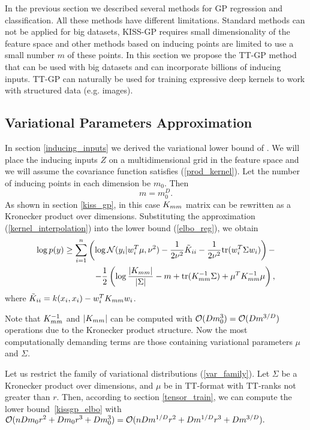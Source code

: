 In the previous section we described several methods for GP regression and
classification. All these methods have different limitations. Standard methods
can not be applied for big datasets, KISS-GP requires small dimensionality of
the feature space and other methods based on inducing points are limited to use
a small number $m$ of these points. In this section we propose the TT-GP method
that can be used with big datasets and can incorporate billions of inducing
inputs. TT-GP can naturally be used for training expressive deep kernels to work
with structured data (e.g. images).

\subsection{Variational Parameters Approximation}
  In section \ref{inducing_inputs} we derived the variational lower bound of
  \citet{hensman2013}. We will place the inducing inputs $Z$ on a
  multidimensional grid in the feature space and we will assume the
  covariance function satisfies (\ref{prod_kernel}). Let the number
  of inducing points in each dimension be $m_0$. Then
  \[
    m = m_0^D.
  \]
  As shown in section \ref{kiss_gp},
  in this case $K_{mm}$ matrix can be rewritten as a Kronecker product over
  dimensions. Substituting the approximation (\ref{kernel_interpolation}) into
  the lower bound (\ref{elbo_reg}), we obtain
  \begin{equation}
  \label{kissgp_elbo}
    \begin{split}
      \log p(y) \ge
      \sum_{i=1}^n \left ( \log \mathcal{N} (y_i | w_i^T \mu, \nu^2) -
        \frac 1 {2\nu^2} \tilde K_{ii} -
        \frac 1 {2\nu^2} \mbox{tr} (w_i^T \Sigma w_i)
      \right )-
      \\
      - \frac 1 2 \left(
        \log \frac {|K_{mm}|} {|\Sigma|} - m + \mbox{tr}(K_{mm}^{-1} \Sigma) +
        \mu^T K_{mm}^{-1} \mu
      \right),
    \end{split}
  \end{equation}
  where $\tilde K_{ii} = k(x_i, x_i) - w_i^T K_{mm} w_i$.

  Note that $K_{mm}^{-1}$ and $|K_{mm}|$ can be computed with
  $\mathcal{O}(D m_0^3) = \mathcal{O}(D m^{3/D})$ operations due to the
  Kronecker product structure. Now the most computationally demanding terms
  are those containing variational parameters $\mu$ and $\Sigma$.

  Let us restrict the family of variational distributions (\ref{var_family}). Let $\Sigma$ be
  a Kronecker product over dimensions, and $\mu$ be in TT-format with TT-ranks
  not greater than $r$. Then, according to section \ref{tensor_train}, we can
  compute the lower bound~\eqref{kissgp_elbo} with
  $\mathcal{O}(nDm_0 r^2 + D m_0 r^3 + Dm_0^3) =
  \mathcal{O}(nD m^{1/D} r^2 + D m^{1/D} r^3 + D m^{3/D}).$

